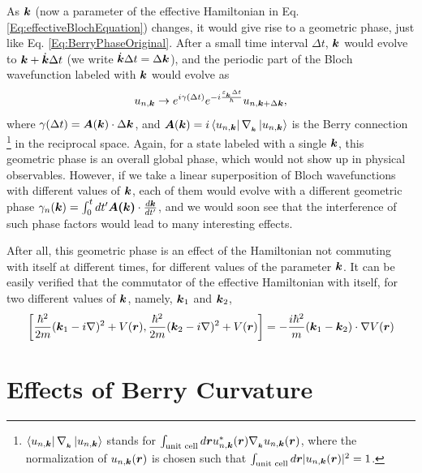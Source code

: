 \documentclass{report}
\renewcommand\vec[1]{\ensuremath\boldsymbol{#1}} %
\begin{document}
As $\vec{k}$ (now a parameter of the effective Hamiltonian in Eq. \eqref{Eq:effectiveBlochEquation}) changes, it would give rise to a geometric phase, just like Eq. \eqref{Eq:BerryPhaseOriginal}. After a small time interval $\Delta t$, $\vec{k}$ would evolve to $\vec{k} + \dot{\vec{k}} \Delta t$ (we write $\dot{\vec{k}} \Delta t = \Delta \vec{k} $), and the periodic part of the Bloch wavefunction labeled with $\vec{k}$ would evolve as 
\begin{equation}\label{Eq:u-n-k-time-evolution}
	u_{n, \vec{k}} \rightarrow e^{i \gamma(\Delta t)} e^{-i \frac{\varepsilon_{_{\vec{k}}} \Delta t}{\hbar}} u_{n, \vec{k}+\Delta \vec{k}},
\end{equation} where $\gamma(\Delta t) =\vec{A}(\vec{k}) \cdot \Delta \vec{k}$, and $ \vec{A}(\vec{k})=i \bra{u_{n,\vec{k}}}\nabla_{_{\vec{k}}} \ket{u_{n,\vec{k}}}$ is the Berry connection \footnote{ $\bra{u_{n,\vec{k}}}\nabla_{_{\vec{k}}} \ket{u_{n,\vec{k}}}$ stands for $\int_\text{unit cell} d\vec{r} u^*_{n,\vec{k}} (\vec{r}) \nabla_{_{\vec{k}}} u_{n,\vec{k}}(\vec{r})$, where the normalization of $u_{n,\vec{k}}(\vec{r})$ is chosen such that $\int_\text{unit cell} d\vec{r} |u_{n,\vec{k}} (\vec{r})|^2 = 1$.} in the reciprocal space. Again, for a state labeled with a single $\vec{k}$, this geometric phase is an overall global phase, which would not show up in physical observables. However, if we take a linear superposition of Bloch wavefunctions with different values of $\vec{k}$, each of them would evolve with a different geometric phase $\gamma_n (\vec{k}) = \int_{0}^{t} dt' \vec{A(\vec{k})} \cdot \frac{d \vec{k}}{dt'} $, and we would soon see that the interference of such phase factors would lead to many interesting effects.

After all, this geometric phase is an effect of the Hamiltonian not commuting with itself at different times, for different values of the parameter $\vec{k}$. It can be easily verified that the commutator of the effective Hamiltonian with itself, for two different values of $\vec{k}$, namely, $\vec{k}_1$ and $\vec{k}_2$,
$$
\left[\frac{\hbar^2}{2m}(\vec{k}_1 - i \nabla)^2 + V(\vec{r}), \frac{\hbar^2}{2m}(\vec{k}_2 - i \nabla)^2 + V(\vec{r}) \right] = -\frac{i \hbar^2}{m} (\vec{k}_1 - \vec{k}_2)\cdot\nabla V(\vec{r})
$$

\section{Effects of Berry Curvature}
\end{document}
